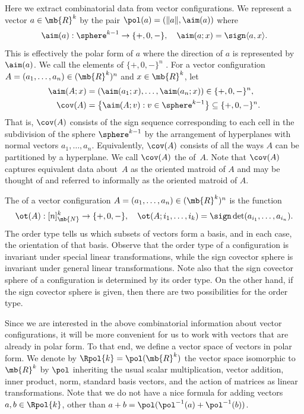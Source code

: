 Here we extract combinatorial data from vector configurations.
We represent a vector $a \in \mb{R}^k$ by the pair $\pol(a) = (\|a\|,\aim (a))$ where
\[ \aim (a) : \sphere^{k-1} \to \{+,0,-\}, \quad \aim (a; x) = \sign \langle a,x \rangle.\]
This is effectively the polar form of $a$ where the direction of $a$ is represented by $\aim(a)$.
We call the elements of $\{+,0,-\}^n$ .
For a vector configuration $A = (a_1,\dots,a_n) \in (\mb{R}^k)^n$ and $x \in \mb{R}^k$, let
\begin{align*}
\aim (A;x) &= (\aim(a_1;x),\dots,\aim(a_n;x)) \in \{+,0,-\}^n, \\
\cov (A) &= \bigl\{ \aim (A; v) :v \in \sphere^{k-1} \bigr\} \subseteq \{+,0,-\}^n.
\end{align*}
That is, $\cov(A)$ consists of the sign sequence corresponding to each cell in the subdivision of the sphere $\sphere^{k-1}$ by the arrangement of hyperplanes with normal vectors $a_1,\dots,a_n$.
Equivalently, $\cov(A)$ consists of all the ways $A$ can be partitioned by a hyper\-plane.
We call $\cov(A)$ the  of~$A$.
Note that $\cov(A)$ captures equivalent data about~$A$ as the oriented matroid of $A$ and may be thought of and referred to informally as the oriented matroid of $A$.

The  of a vector configuration $A = (a_1,\dots,a_n) \in (\mb{R}^k)^n$ is the function
\[ \ot(A): [n]_\mb{N}^k \to \{+,0,-\}, \quad \ot(A;i_1,\dots,i_k) = \sign\det(a_{i_1},\dots,a_{i_n}). \]
The order type tells us which subsets of vectors form a basis, and in each case, the orientation of that basis.
Observe that the order type of a configuration is invariant under special linear transformations, while the sign covector sphere is invariant under general linear transformations.
Note also that the sign covector sphere of a configuration is determined by its order type. On the other hand, if the sign covector sphere is given, then there are two possibilities for the order type.

Since we are interested in the above combinatorial information about vector configurations, it will be more convenient for us to work with vectors that are already in polar form. To that end, we define a vector space of vectors in polar form.
We denote by $\Rpol{k} = \pol(\mb{R}^k)$ the vector space isomorphic to $\mb{R}^k$ by $\pol$ inheriting the usual scalar multiplication, vector addition, inner product, norm, standard basis vectors, and the action of matrices as linear transformations. Note that we do not have a nice formula for adding vectors $a,b \in \Rpol{k}$, other than $a+b = \pol(\pol^{-1}(a)+\pol^{-1}(b))$.

